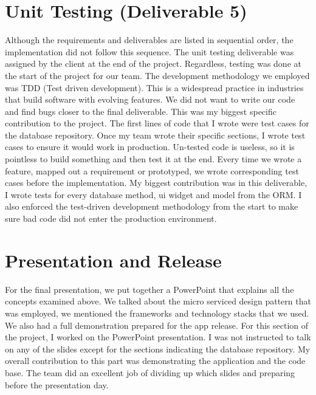 \documentclass{article}
\begin{document}
\section{Unit Testing (Deliverable 5)}
\begin{multicols}{2}

Although the requirements and deliverables are listed in sequential order, the implementation did not follow this sequence. The unit testing deliverable was assigned by the client at the end of the project. Regardless, testing was done at the start of the project for our team. The development methodology we employed was TDD (Test driven development). This is a widespread practice in industries that build software with evolving features. We did not want to write our code and find bugs closer to the final deliverable. This was my biggest specific contribution to the project. The first lines of code that I wrote were test cases for the database repository. Once my team wrote their specific sections, I wrote test cases to ensure it would work in production. Un-tested code is useless, so it is pointless to build something and then test it at the end. Every time we wrote a feature, mapped out a requirement or prototyped, we wrote corresponding test cases before the implementation. My biggest contribution was in this deliverable, I wrote tests for every database method, ui widget and model from the ORM. I also enforced the test-driven development methodology from the start to make sure bad code did not enter the production environment.
\end{multicols} 

\section{Presentation and Release}
For the final presentation, we put together a PowerPoint that explains all the concepts examined above. We talked about the micro serviced design pattern that was employed, we mentioned the frameworks and technology stacks that we used. We also had a full demonstration prepared for the app release. For this section of the project, I worked on the PowerPoint presentation. I was not instructed to talk on any of the slides except for the sections indicating the database repository. My overall contribution to this part was demonstrating the application and the code base. The team did an excellent job of dividing up which slides and preparing before the presentation day.
\end{document}
